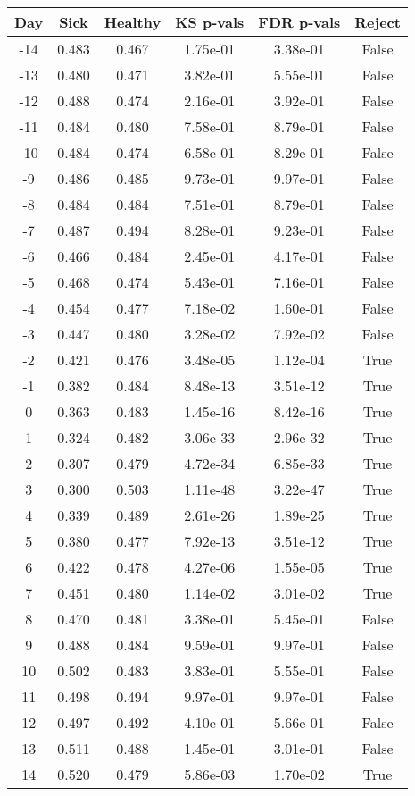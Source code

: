 \begin{tabular}{c|c|c|c|c|c}
Day &  Sick & Healthy &  KS p-vals & FDR p-vals & Reject\\
\hline
-14 & 0.483 &   0.467 &   1.75e-01 &   3.38e-01 &  False\\
-13 & 0.480 &   0.471 &   3.82e-01 &   5.55e-01 &  False\\
-12 & 0.488 &   0.474 &   2.16e-01 &   3.92e-01 &  False\\
-11 & 0.484 &   0.480 &   7.58e-01 &   8.79e-01 &  False\\
-10 & 0.484 &   0.474 &   6.58e-01 &   8.29e-01 &  False\\
 -9 & 0.486 &   0.485 &   9.73e-01 &   9.97e-01 &  False\\
 -8 & 0.484 &   0.484 &   7.51e-01 &   8.79e-01 &  False\\
 -7 & 0.487 &   0.494 &   8.28e-01 &   9.23e-01 &  False\\
 -6 & 0.466 &   0.484 &   2.45e-01 &   4.17e-01 &  False\\
 -5 & 0.468 &   0.474 &   5.43e-01 &   7.16e-01 &  False\\
 -4 & 0.454 &   0.477 &   7.18e-02 &   1.60e-01 &  False\\
 -3 & 0.447 &   0.480 &   3.28e-02 &   7.92e-02 &  False\\
 -2 & 0.421 &   0.476 &   3.48e-05 &   1.12e-04 &   True\\
 -1 & 0.382 &   0.484 &   8.48e-13 &   3.51e-12 &   True\\
  0 & 0.363 &   0.483 &   1.45e-16 &   8.42e-16 &   True\\
  1 & 0.324 &   0.482 &   3.06e-33 &   2.96e-32 &   True\\
  2 & 0.307 &   0.479 &   4.72e-34 &   6.85e-33 &   True\\
  3 & 0.300 &   0.503 &   1.11e-48 &   3.22e-47 &   True\\
  4 & 0.339 &   0.489 &   2.61e-26 &   1.89e-25 &   True\\
  5 & 0.380 &   0.477 &   7.92e-13 &   3.51e-12 &   True\\
  6 & 0.422 &   0.478 &   4.27e-06 &   1.55e-05 &   True\\
  7 & 0.451 &   0.480 &   1.14e-02 &   3.01e-02 &   True\\
  8 & 0.470 &   0.481 &   3.38e-01 &   5.45e-01 &  False\\
  9 & 0.488 &   0.484 &   9.59e-01 &   9.97e-01 &  False\\
 10 & 0.502 &   0.483 &   3.83e-01 &   5.55e-01 &  False\\
 11 & 0.498 &   0.494 &   9.97e-01 &   9.97e-01 &  False\\
 12 & 0.497 &   0.492 &   4.10e-01 &   5.66e-01 &  False\\
 13 & 0.511 &   0.488 &   1.45e-01 &   3.01e-01 &  False\\
 14 & 0.520 &   0.479 &   5.86e-03 &   1.70e-02 &   True\\
\end{tabular}
